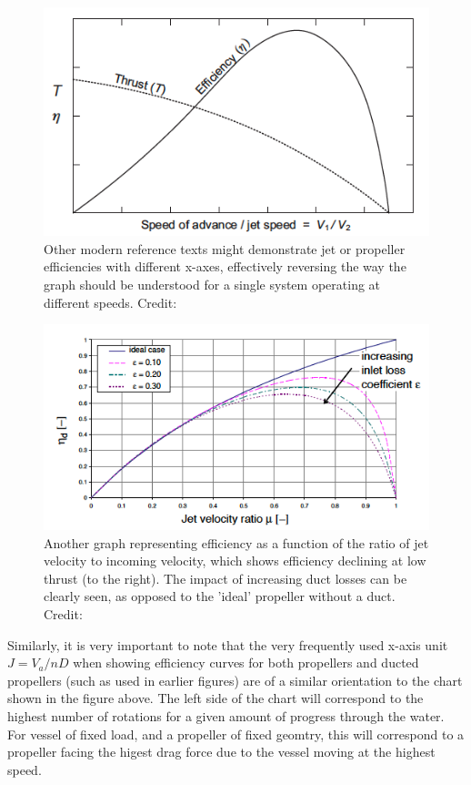\documentclass{article}\usepackage[]{graphicx}\usepackage[]{color}
\begin{document}
\begin{figure}
\includegraphics[width=\textwidth]{EfficiencyMollard.png}
\caption{Other modern reference texts might demonstrate jet or propeller efficiencies with different x-axes, effectively reversing the way the graph should be understood for a single system operating at different speeds. Credit:  \cite{mollard2011}}
\label{fig:EfficiencyMollard.png}
\end{figure}

\begin{figure}
\includegraphics[width=\textwidth]{EfficiencyBulten.png}
\caption{Another graph representing efficiency as a function of the ratio of jet velocity to incoming velocity, which shows efficiency declining at low thrust (to the right).  The impact of increasing duct losses can be clearly seen, as opposed to the 'ideal' propeller without a duct. Credit: \cite{bulten2006numerical}}
\label{fig:EfficiencyBulten.png}
\end{figure}

Similarly, it is very important to note that the very frequently used x-axis unit $J = V_a/nD$ when showing efficiency curves for both propellers and ducted propellers (such as used in earlier figures) are of a similar orientation to the chart shown in the figure above.  The left side of the chart will correspond to the highest number of rotations for a given amount of progress through the water.  For vessel of fixed load, and a propeller of fixed geomtry, this will correspond to a propeller facing the higest drag force due to the vessel moving at the highest speed.
\end{document}
